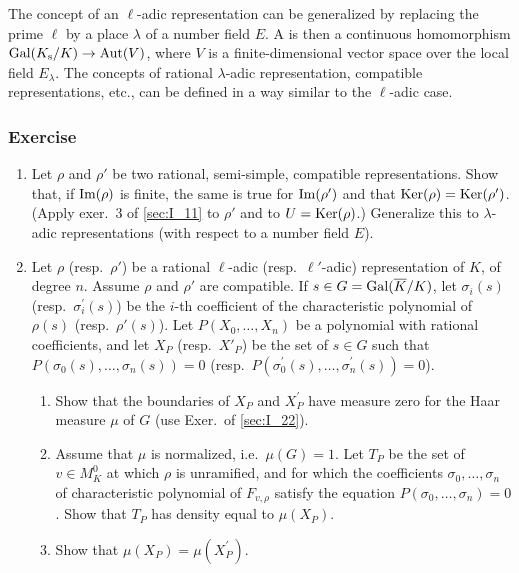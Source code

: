\begin{obs}
The concept of an $\ell$-adic representation can be generalized by replacing
the prime $\ell$ by a place $\lambda$ of a number field  $E$. A  is
then a continuous homomorphism $\operatorname{Gal}(K_{\mathrm{s}}/K) \to \operatorname{Aut}(V)$, where $V$ is a
finite-dimensional vector space over the local field $E_\lambda$. The concepts
of rational $\lambda$-adic representation, compatible representations, etc., can
be defined in a way similar to the $\ell$-adic case.
\end{obs}

\subsubsection*{Exercise}
\begin{enumerate}
\item Let $\rho$ and $\rho'$ be two rational, semi-simple, compatible
	representations. Show that, if $\operatorname{Im}(\rho)$ is finite, the same is true
	for $\operatorname{Im}(\rho')$ and that $\operatorname{Ker}(\rho) = \operatorname{Ker}(\rho')$. (Apply exer.~3 of
	\ref{sec:I_11} to $\rho'$ and to $U = \operatorname{Ker}(\rho)$.) Generalize this to
	$\lambda$-adic representations (with respect to a number field $E$).
\item Let $\rho$ (resp.\ $\rho'$) be a rational $\ell$-adic (resp.\
	$\ell'$-adic) representation of $K$, of degree $n$. Assume $\rho$ and
	$\rho'$ are compatible. If $s \in G = \operatorname{Gal}(\overline{K}/K)$, let
	$\sigma_i(s)$ (resp.\ $\sigma_i^\prime(s)$) be the
	\dpage 
	$i$-th coefficient of the characteristic polynomial of $\rho(s)$ (resp.\
	$\rho'(s)$).
	Let $P(X_0,\hdots,X_n)$ be a polynomial with rational coefficients, and
	let $X_P$ (resp.\ $X'_P$) be the set of $s \in G$ such that
	$P(\sigma_0(s), \dots, \sigma_n(s)) = 0$ (resp.\ $P(\sigma_0^\prime(s),
	\dots, \sigma_n^\prime(s)) = 0$).
\begin{enumerate}
\item Show that the boundaries of $X_P$ and $X_P^\prime$ have measure zero for the
	Haar measure $\mu$ of $G$ (use Exer.\ of \ref{sec:I_22}).
\item Assume that $\mu$ is normalized, i.e.\ $\mu(G) = 1$. Let $T_P$ be the set
	of $v \in M_K^0$ at which $\rho$ is unramified, and for which the
	coefficients $\sigma_0,\hdots,\sigma_n$ of characteristic polynomial of
	$F_{v,\rho}$ satisfy the equation $P(\sigma_0,\hdots,\sigma_n) = 0$.
	Show that $T_P$ has density equal to $\mu(X_P)$.
\item Show that $\mu(X_P) = \mu(X_P^\prime)$.
\end{enumerate}
\end{enumerate}

